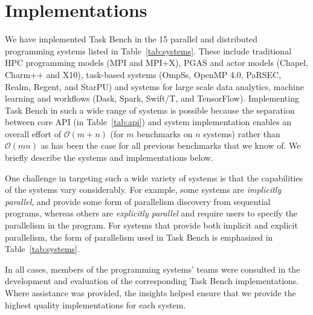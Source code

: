 \section{Implementations}
\label{sec:implementation}

We have implemented Task Bench in the 15 parallel and distributed
programming systems listed in Table~\ref{tab:systems}. These include
traditional HPC programming models (MPI and MPI+X), PGAS and actor
models (Chapel, Charm++ and X10), task-based systems (OmpSs, OpenMP
4.0, PaRSEC, Realm, Regent, and StarPU) and systems for large scale
data analytics, machine learning and workflows (Dask, Spark, Swift/T,
and TensorFlow). Implementing Task Bench in such a wide range of
systems is possible because the separation between core API (in
Table~\ref{tab:api}) and system implementation enables an overall
effort of $\mathcal{O}(m + n)$ (for $m$ benchmarks on $n$ systems)
rather than $\mathcal{O}(mn)$ as has been the case for all previous
benchmarks that we know of. We briefly describe the systems and
implementations below.

One challenge in targeting such a wide variety of
systems is that the capabilities of the systems vary considerably. For
example, some systems are \emph{implicitly parallel}, and provide some
form of parallelism discovery from sequential programs, whereas others
are \emph{explicitly parallel} and require users to specify the
parallelism in the program. For systems that provide both implicit and explicit parallelism, the form of parallelism used in Task Bench is emphasized in Table~\ref{tab:systems}.



In all cases, members of the programming systems' teams
were consulted in the development and evaluation of the
corresponding Task Bench implementations. Where assistance was provided, the insights helped ensure that we provide the highest quality implementations for each system.

